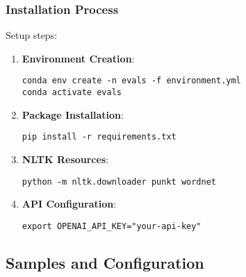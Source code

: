 \subsubsection{Installation Process}
Setup steps:
\begin{enumerate}
    \item \textbf{Environment Creation}:
    \begin{lstlisting}[breaklines=true, basicstyle=\ttfamily\footnotesize]
conda env create -n evals -f environment.yml
conda activate evals
    \end{lstlisting}

    \item \textbf{Package Installation}:
    \begin{lstlisting}[breaklines=true, basicstyle=\ttfamily\footnotesize]
pip install -r requirements.txt
    \end{lstlisting}

    \item \textbf{NLTK Resources}:
    \begin{lstlisting}[breaklines=true, basicstyle=\ttfamily\footnotesize]
python -m nltk.downloader punkt wordnet
    \end{lstlisting}

    \item \textbf{API Configuration}:
    \begin{lstlisting}[breaklines=true, basicstyle=\ttfamily\footnotesize]
export OPENAI_API_KEY="your-api-key"
    \end{lstlisting}
\end{enumerate}

\subsection{Samples and Configuration}

